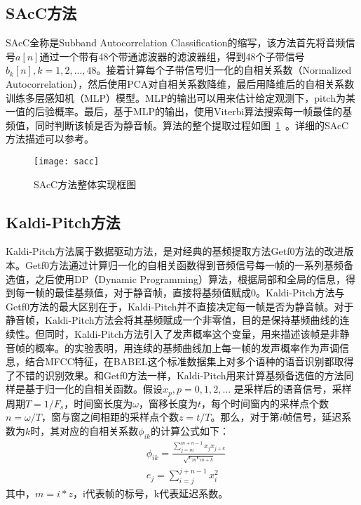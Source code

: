 \subsection{SAcC方法}
SAcC全称是Subband Autocorrelation Classification的缩写，该方法首先将音频信号$a[n]$通过一个带有48个带通滤波器的滤波器组，得到48个子带信号$b_k[n],k=1,2,...,48$。接着计算每个子带信号归一化的自相关系数（Normalized Autocorrelation），然后使用PCA对自相关系数降维，最后用降维后的自相关系数训练多层感知机（MLP）模型。MLP的输出可以用来估计给定观测下，pitch为某一值的后验概率。最后，基于MLP的输出，使用Viterbi算法搜索每一帧最佳的基频值，同时判断该帧是否为静音帧。算法的整个提取过程如图~\ref{fig:sacc}~。详细的SAcC 方法描述可以参考\cite{lee2012noise}。
\begin{figure}[htbp]
\centering
\texttt{[image: sacc]}
\caption{SAcC方法整体实现框图\cite{lee2012noise}}\label{fig:sacc}
\vspace{\baselineskip}
\end{figure}

\subsection{Kaldi-Pitch方法}
Kaldi-Pitch方法\cite{ghahremani2014pitch}属于数据驱动方法，是对经典的基频提取方法Getf0方法\cite{kleijn1995robust}的改进版本。Getf0方法通过计算归一化的自相关函数得到音频信号每一帧的一系列基频备选值，之后使用DP（Dynamic Programming）算法，根据局部和全局的信息，得到每一帧的最佳基频值，对于静音帧，直接将基频值赋成0。Kaldi-Pitch方法与Getf0方法的最大区别在于，Kaldi-Pitch并不直接决定每一帧是否为静音帧。对于静音帧，Kaldi-Pitch方法会将其基频赋成一个非零值，目的是保持基频曲线的连续性。但同时，Kaldi-Pitch方法引入了发声概率这个变量，用来描述该帧是非静音帧的概率。\cite{ghahremani2014pitch}的实验表明，用连续的基频曲线加上每一帧的发声概率作为声调信息，结合MFCC特征，在BABEL这个标准数据集上对多个语种的语音识别都取得了不错的识别效果。和Getf0方法一样，Kaldi-Pitch用来计算基频备选值的方法同样是基于归一化的自相关函数。假设$x_p,p=0,1,2,...$ 是采样后的语音信号，采样周期$T=1/F_s$，时间窗长度为$\omega$，窗移长度为$t$，每个时间窗内的采样点个数$n=\omega/T$，窗与窗之间相距的采样点个数$z=t/T$。那么，对于第$i$帧信号，延迟系数为$k$时，其对应的自相关系数$\phi_{ik}$的计算公式如下：
\begin{eqnarray}
  &\phi_{ik}=\frac{\sum_{j=m}^{m+n-1} x_j x_{j+k}}{\sqrt{e_m e_{m+k}}} \\
  &e_j=\sum_{i=j}^{j+n-1} x_i^2
\end{eqnarray}
其中，$m=i*z$，i代表帧的标号，k代表延迟系数。

